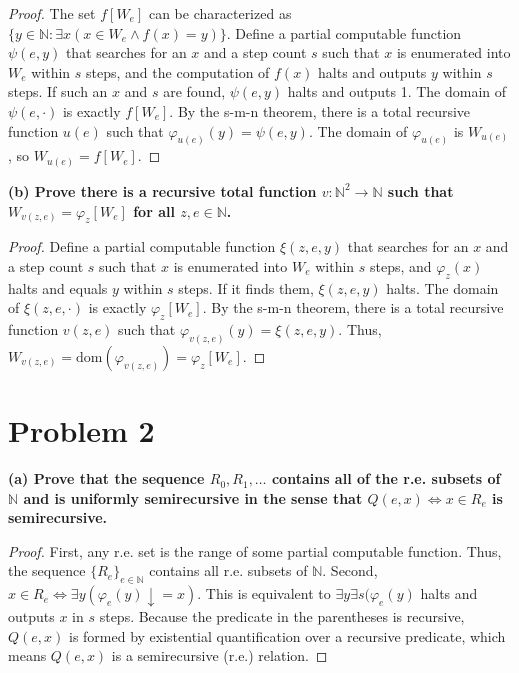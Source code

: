 \documentclass{article}
\begin{document}
\begin{proof}
The set $f[W_e]$ can be characterized as $\{ y \in \mathbb{N} : \exists x (x \in W_e \land f(x) = y) \}$.
Define a partial computable function $\psi(e, y)$ that searches for an $x$ and a step count $s$ such that $x$ is enumerated into $W_e$ within $s$ steps, and the computation of $f(x)$ halts and outputs $y$ within $s$ steps. If such an $x$ and $s$ are found, $\psi(e, y)$ halts and outputs 1.
The domain of $\psi(e, \cdot)$ is exactly $f[W_e]$.
By the s-m-n theorem, there is a total recursive function $u(e)$ such that $\varphi_{u(e)}(y) = \psi(e, y)$. The domain of $\varphi_{u(e)}$ is $W_{u(e)}$, so $W_{u(e)} = f[W_e]$.
\end{proof}

\textbf{(b) Prove there is a recursive total function $v: \mathbb{N}^2 \to \mathbb{N}$ such that $W_{v(z,e)} = \varphi_z[W_e]$ for all $z, e \in \mathbb{N}$.}

\begin{proof}
Define a partial computable function $\xi(z, e, y)$ that searches for an $x$ and a step count $s$ such that $x$ is enumerated into $W_e$ within $s$ steps, and $\varphi_z(x)$ halts and equals $y$ within $s$ steps. If it finds them, $\xi(z, e, y)$ halts.
The domain of $\xi(z, e, \cdot)$ is exactly $\varphi_z[W_e]$.
By the s-m-n theorem, there is a total recursive function $v(z, e)$ such that $\varphi_{v(z,e)}(y) = \xi(z, e, y)$. Thus, $W_{v(z,e)} = \text{dom}(\varphi_{v(z,e)}) = \varphi_z[W_e]$.
\end{proof}

\hrulefill

\section*{Problem 2}
\textbf{(a) Prove that the sequence $R_0, R_1, \dots$ contains all of the r.e. subsets of $\mathbb{N}$ and is uniformly semirecursive in the sense that $Q(e, x) \iff x \in R_e$ is semirecursive.}

\begin{proof}
First, any r.e. set is the range of some partial computable function. Thus, the sequence $\{R_e\}_{e \in \mathbb{N}}$ contains all r.e. subsets of $\mathbb{N}$.
Second, $x \in R_e \iff \exists y (\varphi_e(y) \downarrow = x)$. This is equivalent to $\exists y \exists s (\varphi_e(y)$  halts and outputs  $x$ in $s$ steps. Because the predicate in the parentheses is recursive, $Q(e, x)$ is formed by existential quantification over a recursive predicate, which means $Q(e, x)$ is a semirecursive (r.e.) relation.
\end{proof}
\end{document}
